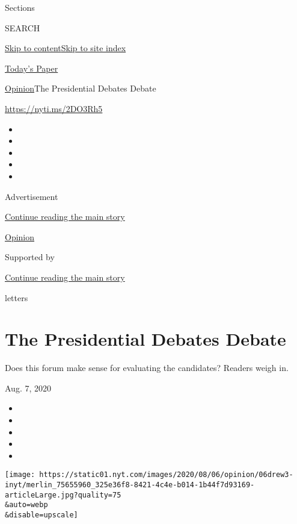 Sections

SEARCH

\protect\hyperlink{site-content}{Skip to
content}\protect\hyperlink{site-index}{Skip to site index}

\href{https://myaccount.nytimes.com/auth/login?response_type=cookie\&client_id=vi}{}

\href{https://www.nytimes.com/section/todayspaper}{Today's Paper}

\href{/section/opinion}{Opinion}\textbar{}The Presidential Debates
Debate

\href{https://nyti.ms/2DO3Rh5}{https://nyti.ms/2DO3Rh5}

\begin{itemize}
\item
\item
\item
\item
\item
\end{itemize}

Advertisement

\protect\hyperlink{after-top}{Continue reading the main story}

\href{/section/opinion}{Opinion}

Supported by

\protect\hyperlink{after-sponsor}{Continue reading the main story}

letters

\hypertarget{the-presidential-debates-debate}{%
\section{The Presidential Debates
Debate}\label{the-presidential-debates-debate}}

Does this forum make sense for evaluating the candidates? Readers weigh
in.

Aug. 7, 2020

\begin{itemize}
\item
\item
\item
\item
\item
\end{itemize}

\texttt{[image: https://static01.nyt.com/images/2020/08/06/opinion/06drew3-inyt/merlin\_75655960\_325e36f8-8421-4c4e-b014-1b44f7d93169-articleLarge.jpg?quality=75\\\&auto=webp\\\&disable=upscale]}

